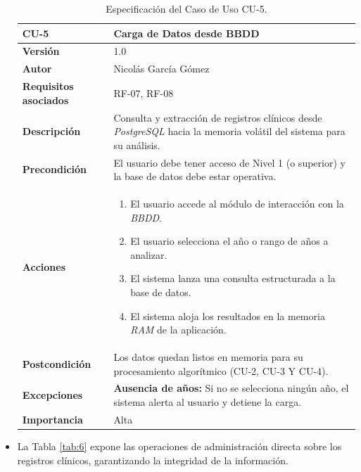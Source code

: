 \begin{itemize}
\begin{table}[hbt!]	\centering
	\begin{tabularx}{\linewidth}{ p{} p{} }
		\toprule
		\textbf{CU-5}    & \textbf{Carga de Datos desde BBDD}\\
		\toprule
		\textbf{Versión}              & 1.0    \\
		\textbf{Autor}                & Nicolás García Gómez \\
		\textbf{Requisitos asociados} & RF-07, RF-08 \\
		\textbf{Descripción}          & Consulta y extracción de registros clínicos desde \textit{PostgreSQL} hacia la memoria volátil del sistema para su análisis. \\
		\textbf{Precondición}         & El usuario debe tener acceso de Nivel 1 (o superior) y la base de datos debe estar operativa. \\
		\textbf{Acciones}             &
		\begin{enumerate}
			\def\labelenumi{\arabic{enumi}.}
			\item El usuario accede al módulo de interacción con la \textit{BBDD}.
			\item El usuario selecciona el año o rango de años a analizar.
			\item El sistema lanza una consulta estructurada a la base de datos.
			\item El sistema aloja los resultados en la memoria \textit{RAM} de la aplicación.
		\end{enumerate}\\
		\textbf{Postcondición}        & Los datos quedan listos en memoria para su procesamiento algorítmico (CU-2, CU-3 Y CU-4). \\
		\textbf{Excepciones}          & \textbf{Ausencia de años:} Si no se selecciona ningún  año, el sistema alerta al usuario y detiene la carga. \\
		\textbf{Importancia}          & Alta \\
		\bottomrule
	\end{tabularx}
	\caption{Especificación del Caso de Uso CU-5.}
	\label{tab:5}
\end{table}	

	\item La Tabla \ref{tab:6} expone las operaciones de administración directa sobre los registros clínicos, garantizando la integridad de la información.
	

\end{itemize}
